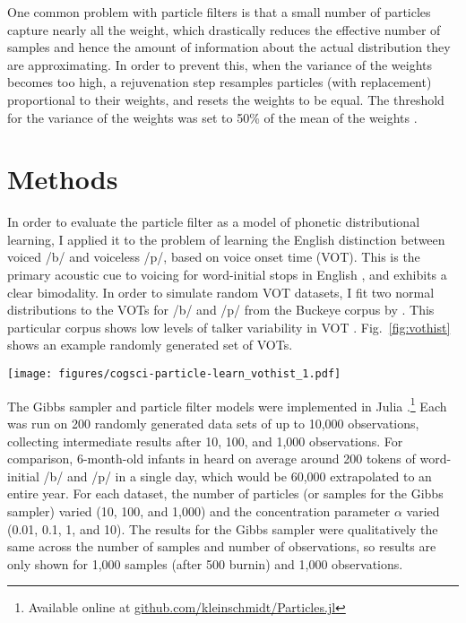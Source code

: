 \documentclass[10pt,letterpaper]{article}
\let\origfigure\figure
\let\endorigfigure\endfigure
\renewenvironment{figure}[1][2] {
    \expandafter\origfigure\expandafter[tbp]
} {
    \endorigfigure
}
\begin{document}
One common problem with particle filters is that a small number of
particles capture nearly all the weight, which drastically reduces the
effective number of samples and hence the amount of information about
the actual distribution they are approximating. In order to prevent
this, when the variance of the weights becomes too high, a rejuvenation
step resamples particles (with replacement) proportional to their
weights, and resets the weights to be equal. The threshold for the
variance of the weights was set to 50\% of the mean of the weights
\autocite[as suggested by][]{Fearnhead2004}.

\hypertarget{methods}{%
\section{Methods}\label{methods}}

In order to evaluate the particle filter as a model of phonetic
distributional learning, I applied it to the problem of learning the
English distinction between voiced /b/ and voiceless /p/, based on voice
onset time (VOT). This is the primary acoustic cue to voicing for
word-initial stops in English \autocite{Lisker1964}, and exhibits a
clear bimodality. In order to simulate random VOT datasets, I fit two
normal distributions to the VOTs for /b/ and /p/ from the Buckeye corpus
\autocite{Pitt2007} by \textcite{Nelson2017}. This particular corpus
shows low levels of talker variability in VOT
\autocite[see][]{Kleinschmidta}. Fig.~\ref{fig:vothist} shows an example
randomly generated set of VOTs.

\begin{figure}
\hypertarget{fig:vothist}{%
\centering
\texttt{[image: figures/cogsci-particle-learn\_vothist\_1.pdf]}
\caption{Example sample of VOTs used to assess distributional learning
models. With fewer observations, the cluster structure is not obvious,
but with more clusters it bnecomes clearer.}\label{fig:vothist}
}
\end{figure}

The Gibbs sampler and particle filter models were implemented in Julia
\autocite{Bezanson2017}.\footnote{Available online at
  \href{https://github.com/kleinschmidt/Particles.jl}{github.com/kleinschmidt/Particles.jl}}
Each was run on 200 randomly generated data sets of up to 10,000
observations, collecting intermediate results after 10, 100, and 1,000
observations. For comparison, 6-month-old infants in
\textcite{Bergelson2017} heard on average around 200 tokens of
word-initial /b/ and /p/ in a single day, which would be 60,000
extrapolated to an entire year. For each dataset, the number of
particles (or samples for the Gibbs sampler) varied (10, 100, and 1,000)
and the concentration parameter \(\alpha\) varied (0.01, 0.1, 1, and
10). The results for the Gibbs sampler were qualitatively the same
across the number of samples and number of observations, so results are
only shown for 1,000 samples (after 500 burnin) and 1,000 observations.
\end{document}

